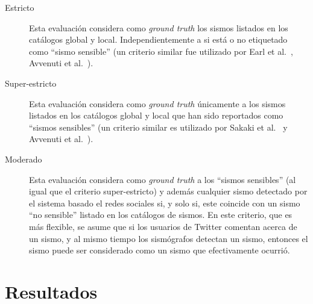 \begin{description}

\item[Estricto] Esta evaluación considera como \textit{ground truth} los sismos listados en los catálogos global y local. Independientemente a si está o no etiquetado como ``sismo sensible'' (un criterio similar fue utilizado por Earl et al.~\cite{earle2010omg}, Avvenuti et al.~\cite{avvenuti2014earthquake,avvenuti2014ears}).

\item[Super-estricto] Esta evaluación considera como \textit{ground truth} únicamente a los sismos listados en los catálogos global y local que han sido reportados como ``sismos sensibles'' (un criterio similar es utilizado por Sakaki et al.~\cite{sakaki2013tweet} y Avvenuti et al.~\cite{avvenuti2014earthquake,avvenuti2014ears}).

\item[Moderado] Esta evaluación considera como \textit{ground truth} a los ``sismos sensibles'' (al igual que el criterio super-estricto) y además cualquier sismo detectado por el sistema basado el redes sociales si, y solo si, este coincide con un sismo ``no sensible'' listado en los catálogos de sismos. En este criterio, que es más flexible, se asume que si los usuarios de Twitter comentan acerca de un sismo, y al mismo tiempo los sismógrafos detectan un sismo, entonces el sismo puede ser considerado como un sismo que efectivamente ocurrió.

\end{description} 

\section{Resultados}
\label{sec:results}

